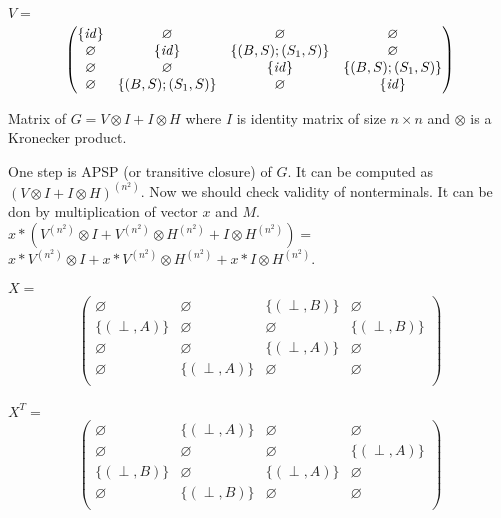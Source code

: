 $V=$
\begin{align*}
\begin{pmatrix}
      \{ \text{\emph{id}} \}       & \varnothing       & \varnothing       & \varnothing  \\ 
      \varnothing       & \{ \text{\emph{id}} \}       & \{(B,S);(S_1,S)\} & \varnothing  \\
      \varnothing       & \varnothing       & \{ \text{\emph{id}} \}       & \{(B,S);(S_1,S)\}  \\
      \varnothing       & \{(B,S);(S_1,S)\} & \varnothing       & \{ \text{\emph{id}} \}  \\
\end{pmatrix}
\end{align*}


Matrix of $G = V \otimes I + I \otimes H$ where $I$ is identity matrix of size $n \times n$ and $\otimes$ is a Kronecker product.


One step is APSP (or transitive closure) of $G$.
It can be computed as $(V \otimes I + I \otimes H)^{(n^2)}$.
Now we should check validity of nonterminals.
It can be don by multiplication of vector $x$ and $M$.
$x*(V^{(n^2)} \otimes I + V^{(n^2)} \otimes H^{(n^2)} + I \otimes H^{(n^2)}) = $
$x*V^{(n^2)} \otimes I + x*V^{(n^2)} \otimes H^{(n^2)} + x * I \otimes H^{(n^2)} $.




$X=$
\begin{align*}
\begin{pmatrix}
      \varnothing            & \varnothing            & \{ (\perp,B) \}            & \varnothing            \\
      \{ (\perp,A) \}        & \varnothing            & \varnothing                & \{ (\perp,B) \}            \\
      \varnothing            & \varnothing            & \{ (\perp,A) \}            & \varnothing      \\
      \varnothing            & \{ (\perp,A) \}            & \varnothing      & \varnothing  \\
\end{pmatrix}
\end{align*}

$X^T=$
\begin{align*}
\begin{pmatrix}
      \varnothing            & \{ (\perp,A) \}        & \varnothing            & \varnothing            \\
      \varnothing            & \varnothing            & \varnothing                & \{ (\perp,A) \}            \\
      \{ (\perp,B) \}        & \varnothing            & \{ (\perp,A) \}            & \varnothing      \\
      \varnothing            & \{ (\perp,B) \}            & \varnothing      & \varnothing  \\
\end{pmatrix}
\end{align*}